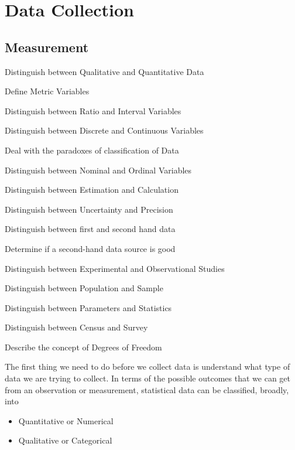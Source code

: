 \section{Data Collection}

\subsection{Measurement}
\begin{objectives}
\item Distinguish between Qualitative and Quantitative Data
\item Define Metric Variables
\item Distinguish between Ratio and Interval Variables
\item Distinguish between Discrete and Continuous Variables
\item Deal with the paradoxes of classification of Data
\item Distinguish between Nominal and Ordinal Variables
\item Distinguish between Estimation and Calculation
\item Distinguish between Uncertainty and Precision
\item Distinguish between first and second hand data
\item Determine if a second-hand data source is good
\item Distinguish between Experimental and Observational Studies
\item Distinguish between Population and Sample
\item Distinguish between Parameters and Statistics
\item Distinguish between Census and Survey
\item Describe the concept of Degrees of Freedom
\end{objectives}

\newpage

The first thing we need to do before we collect data is understand what type of data we are trying to collect. In terms of the possible outcomes that we can get from an observation or measurement, statistical data can be classified, broadly, into 

\begin{itemize}
\item Quantitative or Numerical
\item Qualitative or Categorical
\end{itemize}

